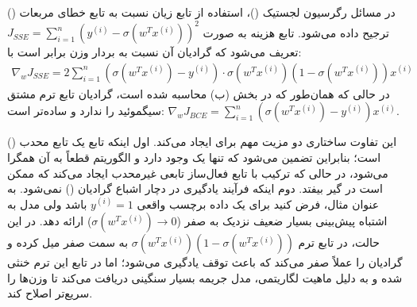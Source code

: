 \question{}

\begin{ابجد}
\item در مسائل رگرسیون لجستیک ()، استفاده از تابع زیان  نسبت به تابع خطای مربعات () ترجیح داده می‌شود. تابع هزینه  به صورت $J_{SSE} = \sum_{i=1}^{n} (y^{(i)} - \sigma(w^Tx^{(i)}))^2$ تعریف می‌شود که گرادیان آن نسبت به بردار وزن برابر است با:
\begin{align*}
    \nabla_w J_{SSE} = 2 \sum_{i=1}^{n} (\sigma(w^Tx^{(i)}) - y^{(i)}) \cdot \sigma(w^Tx^{(i)})(1 - \sigma(w^Tx^{(i)})) x^{(i)}
\end{align*}
در حالی که همان‌طور که در بخش (ب) محاسبه شده است، گرادیان تابع  ترم مشتق سیگموئید را ندارد و ساده‌تر است: $\nabla_w J_{BCE} = \sum_{i=1}^{n} (\sigma(w^Tx^{(i)}) - y^{(i)}) x^{(i)}$.

این تفاوت ساختاری دو مزیت مهم برای  ایجاد می‌کند. اول اینکه تابع  یک تابع محدب () است؛ بنابراین تضمین می‌شود که تنها یک  وجود دارد و الگوریتم  قطعاً به آن همگرا می‌شود، در حالی که ترکیب  با تابع فعال‌ساز  تابعی غیرمحدب ایجاد می‌کند که ممکن است در  گیر بیفتد. دوم اینکه فرآیند یادگیری در  دچار اشباع گرادیان () نمی‌شود. به عنوان مثال، فرض کنید برای یک داده برچسب واقعی $y^{(i)} = 1$ باشد ولی مدل به اشتباه پیش‌بینی بسیار ضعیف نزدیک به صفر ($\sigma(w^Tx^{(i)}) \to 0$) ارائه دهد. در این حالت، در تابع  ترم $\sigma(w^Tx^{(i)})(1 - \sigma(w^Tx^{(i)}))$ به سمت صفر میل کرده و گرادیان را عملاً صفر می‌کند که باعث توقف یادگیری می‌شود؛ اما در تابع  این ترم خنثی شده و به دلیل ماهیت لگاریتمی، مدل جریمه بسیار سنگینی دریافت می‌کند تا وزن‌ها را سریع‌تر اصلاح کند.


\end{ابجد}
